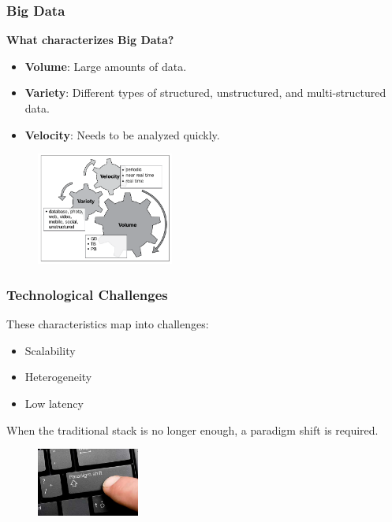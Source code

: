 \documentclass[hyperref={pdfpagelabels=true}]{beamer}
\begin{document}
\begin{frame}
\end{frame}

\begin{frame}
\frametitle{Big Data}
\textbf{What characterizes Big Data?}%
    \begin{itemize}
      \item<2->\textbf{Volume}: Large amounts of data.
      \item<3->\textbf{Variety}: Different types of structured, unstructured, and multi-structured data.
      \item<4->\textbf{Velocity}: Needs to be analyzed quickly.
      \end{itemize}
    \begin{figure}       
	\includegraphics[width=0.4\textwidth]{3vs.png}      
     \end{figure}      
\end{frame}

\begin{frame}
\frametitle{Technological Challenges}
These characteristics map into challenges:
    \begin{itemize}
      \item Scalability %
      \item Heterogeneity %
      \item Low latency %
      \end{itemize}
\vspace{5mm}      
When the traditional stack is no longer enough, a paradigm shift is required.
\begin{figure}   
  \includegraphics[width=0.3\textwidth]{paradigm_shift.jpg}   
\end{figure}   
\end{frame}
\end{document}

